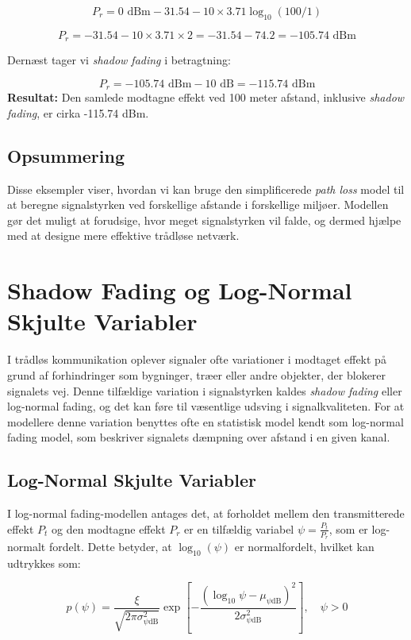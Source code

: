\documentclass[a4paper,12pt]{book}
\begin{document}
	\[
	P_r = 0 \text{ dBm} - 31.54 - 10 \times 3.71 \log_{10}(100/1)
	\]
	
	\[
	P_r = -31.54 - 10 \times 3.71 \times 2 = -31.54 - 74.2 = -105.74 \text{ dBm}
	\]
	
	Dernæst tager vi \textit{shadow fading} i betragtning:
	
	\[
	P_r = -105.74 \text{ dBm} - 10 \text{ dB} = -115.74 \text{ dBm}
	\]
	\noindent\textbf{Resultat:} Den samlede modtagne effekt ved 100 meter afstand, inklusive \textit{shadow fading}, er cirka -115.74 dBm.
	
	
	\subsection{Opsummering}
	
	Disse eksempler viser, hvordan vi kan bruge den simplificerede \textit{path loss} model til at beregne signalstyrken ved forskellige afstande i forskellige miljøer. Modellen gør det muligt at forudsige, hvor meget signalstyrken vil falde, og dermed hjælpe med at designe mere effektive trådløse netværk.
	
	
	\section{Shadow Fading og Log-Normal Skjulte Variabler}
	
	I trådløs kommunikation oplever signaler ofte variationer i modtaget effekt på grund af forhindringer som bygninger, træer eller andre objekter, der blokerer signalets vej. Denne tilfældige variation i signalstyrken kaldes \textit{shadow fading} eller log-normal fading, og det kan føre til væsentlige udsving i signalkvaliteten. For at modellere denne variation benyttes ofte en statistisk model kendt som log-normal fading model, som beskriver signalets dæmpning over afstand i en given kanal.
	
	\subsection{Log-Normal Skjulte Variabler}
	
	I log-normal fading-modellen antages det, at forholdet mellem den transmitterede effekt \( P_t \) og den modtagne effekt \( P_r \) er en tilfældig variabel \( \psi = \frac{P_t}{P_r} \), som er log-normalt fordelt. Dette betyder, at \( \log_{10}(\psi) \) er normalfordelt, hvilket kan udtrykkes som:
	
	\[
	p(\psi) = \frac{\xi}{\sqrt{2\pi\sigma_{\psi\text{dB}}^2}} \exp \left[ -\frac{(\log_{10}\psi - \mu_{\psi\text{dB}})^2}{2\sigma_{\psi\text{dB}}^2} \right], \quad \psi > 0
	\]
	
\end{document}
